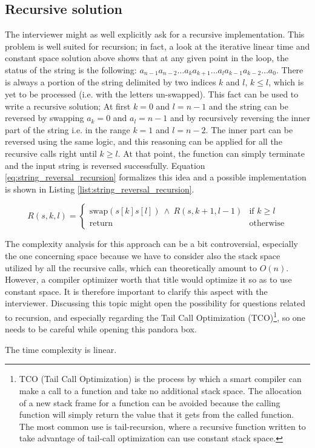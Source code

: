 \subsection{Recursive solution}
The interviewer might as well explicitly ask for a recursive implementation.
This problem is well suited for recursion; in fact, a look at the iterative linear time and constant space solution above shows that at any given point in the loop, the status of the string is the following: 
$a_{n-1}a_{n-2} \ldots a_k a_{k+1} \ldots a_l a_{k-1}a_{k-2} \ldots a_0$. 
There is always a portion of the string delimited by two indices $k$ and $l$, $k \leq l$, which is yet to be processed (i.e. with the letters un-swapped). 
This fact can be used to write a recursive solution;
At first $k=0$ and $l=n-1$ and the string can be reversed by swapping $a_k=0$ and $a_l=n-1$ and
by recursively reversing the inner part of the string i.e. in the range $k=1$ and $l=n-2$.
The inner part can be reversed using the same logic, and this reasoning can be applied for all the recursive calls right until $k \geq l$. At that point, the function can simply terminate and the input string is reversed successfully.
Equation \ref{eq:string_reversal_recursion} formalizes this idea and a possible implementation is shown in Listing \ref{list:string_reversal_recursion}.

\begin{equation}
	R(s, k, l)=
	\begin{cases} 
		\text{swap}(s[k]s[l]) \: \wedge \: R(s,k+1, l-1) & \text{if } k\geq l\\
		\text{return} & \text{otherwise}
	\end{cases}
\label{eq:string_reversal_recursion}
\end{equation} 





The complexity analysis for this approach can be a bit controversial, especially the one concerning space because we have to consider also
the stack space utilized by all the recursive calls, which can theoretically amount to $O(n)$. However, a compiler optimizer worth that title would optimize it so as to use constant space. 
It is therefore important to clarify this aspect with the interviewer.
Discussing this topic might open the possibility for questions related
to recursion, and especially regarding the
Tail Call Optimization (TCO)\footnote{TCO (Tail Call Optimization) is the process by which a smart compiler can make a call to a function and take no additional stack space. The allocation of a new stack frame for a function can be avoided because the calling function will simply return the value that it gets from the called function. The most common use is tail-recursion, where a recursive function written to take advantage of tail-call optimization can	use constant stack space.}, so one needs to be careful while opening this pandora box.

The time complexity is linear. 

